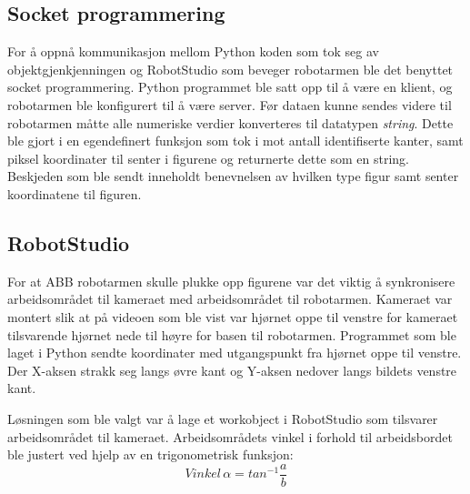 \documentclass[conference]{IEEEtran}
\begin{document}
    \subsection{Socket programmering}
        For å oppnå kommunikasjon mellom Python koden som tok seg av objektgjenkjenningen og RobotStudio som beveger robotarmen ble det benyttet socket programmering. Python programmet ble satt opp til å være en klient, og robotarmen ble konfigurert til å være server. Før dataen kunne sendes videre til robotarmen måtte alle numeriske verdier konverteres til datatypen \textit{string}.  Dette ble gjort i en egendefinert funksjon som tok i mot antall identifiserte kanter, samt piksel koordinater til senter i figurene og returnerte dette som en string. Beskjeden som ble sendt inneholdt benevnelsen av hvilken type figur samt senter koordinatene til figuren.

    \subsection{RobotStudio}
        For at ABB robotarmen skulle plukke opp figurene var det viktig å synkronisere arbeidsområdet til kameraet med arbeidsområdet til robotarmen. 
        Kameraet var montert slik at på videoen som ble vist var hjørnet oppe til venstre for kameraet tilsvarende hjørnet nede til høyre for basen til robotarmen. Programmet som ble laget i Python sendte koordinater med utgangspunkt fra hjørnet oppe til venstre. Der X-aksen strakk seg langs øvre kant og Y-aksen nedover langs bildets venstre kant.

        Løsningen som ble valgt var å lage et workobject i RobotStudio som tilsvarer arbeidsområdet til kameraet. Arbeidsområdets vinkel i forhold til arbeidsbordet ble justert ved hjelp av en trigonometrisk funksjon:
        \begin{equation*}
            Vinkel \,\alpha = tan^{-1}\frac{a}{b}
        \end{equation*}

        \begin{center}
        \end{center}
\end{document}
